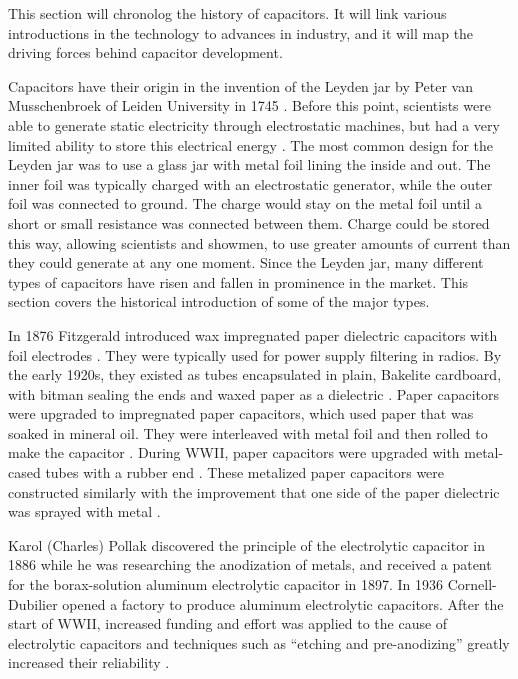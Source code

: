 This section will chronolog the history of capacitors. It will link various introductions in the technology to advances in industry, and it will map the driving forces behind capacitor development.

Capacitors have their origin in the invention of the Leyden jar by Peter van Musschenbroek of Leiden University in 1745 \cite{empLight}. Before this point, scientists were able to generate static electricity through electrostatic machines, but had a very limited ability to store this electrical energy \cite{ieee_hist}.
The most common design for the Leyden jar was to use a glass jar with metal foil lining the inside and out. The inner foil was typically charged with an electrostatic generator, while the outer foil was connected to ground. The charge would stay on the metal foil until a short or small resistance was connected between them. Charge could be stored this way, allowing scientists and showmen, to use greater amounts of current than they could generate at any one moment.
Since the Leyden jar, many different types of capacitors have risen and fallen in prominence in the market. This section covers the historical introduction of some of the major types.

In 1876 Fitzgerald introduced wax impregnated paper dielectric capacitors with foil electrodes \cite[ch.~11]{dumInv}\cite{learn_caps}. They were typically used for power supply filtering in radios. By the early 1920s, they existed as tubes encapsulated in plain, Bakelite cardboard, with bitman sealing the ends and waxed paper as a dielectric \cite[ch~3]{dumInv}.
Paper capacitors were upgraded to impregnated paper capacitors, which used paper that was soaked in mineral oil. They were interleaved with metal foil and then rolled to make the capacitor \cite[ch.~8.2.1.1]{poorIntro}. During WWII, paper capacitors were upgraded with metal-cased tubes with a rubber end \cite[ch.~8.1]{poorIntro}. These metalized paper capacitors were constructed similarly with the improvement that one side of the paper dielectric was sprayed with metal \cite{hist_cerFilt}.

Karol (Charles) Pollak discovered the principle of the electrolytic capacitor in 1886 while he was researching the anodization of metals, and received a patent for the borax-solution aluminum electrolytic capacitor in 1897.
In 1936 Cornell-Dubilier opened a factory to produce aluminum electrolytic capacitors.
After the start of WWII, increased funding and effort was applied to the cause of electrolytic capacitors and techniques such as ``etching and pre-anodizing'' greatly increased their reliability \cite{deis_hist}\cite{wiki_elec}.

